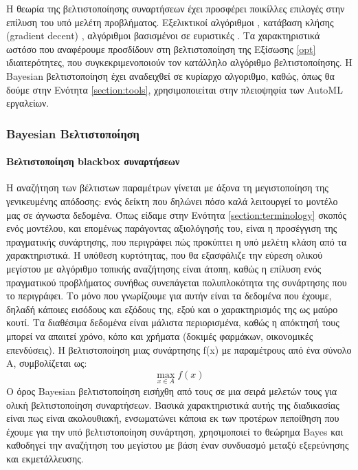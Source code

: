 	Η θεωρία της βελτιστοποίησης συναρτήσεων έχει προσφέρει ποικίλλες επιλογές στην επίλυση του υπό μελέτη προβλήματος. Eξελικτικοί αλγόριθμοι \citep{1554741}, κατάβαση κλήσης (gradient decent) \citep{wassenberg},  αλγόριθμοι βασισμένοι σε ευριστικές \citep{Nelder01011965, Huang2006}. Τα χαρακτηριστικά ωστόσο που αναφέρουμε προσδίδουν στη βελτιστοποίηση της Εξίσωσης \ref{opt} ιδιαιτερότητες, που συγκεκριμενοποιούν τον κατάλληλο αλγόριθμο βελτιστοποίησης. Η Bayesian βελτιστοποίηση έχει αναδειχθεί σε κυρίαρχο αλγοριθμο, καθώς, όπως θα δούμε στην Ενότητα \ref{section:tools}, χρησιμοποιείται στην πλειοψηφία των \gls{AutoML} εργαλείων.
 \subsubsection{Bayesian Βελτιστοποίηση}
 	\paragraph{Βελτιστοποίηση blackbox συναρτήσεων} Η αναζήτηση των βέλτιστων παραμέτρων γίνεται με άξονα τη μεγιστοποίηση της γενικευμένης απόδοσης: ενός δείκτη που δηλώνει πόσο καλά λειτουργεί το μοντέλο μας σε άγνωστα δεδομένα. Όπως είδαμε στην Ενότητα \ref{section:terminology} σκοπός ενός μοντέλου, και επομένως παράγοντας αξιολόγησής του, είναι η προσέγγιση της πραγματικής συνάρτησης, που περιγράφει πώς προκύπτει η υπό μελέτη κλάση από τα χαρακτηριστικά. Η υπόθεση κυρτότητας, που θα εξασφάλιζε την εύρεση ολικού μεγίστου με αλγόριθμο τοπικής αναζήτησης είναι άτοπη, καθώς η επίλυση ενός πραγματικού προβλήματος συνήθως συνεπάγεται πολυπλοκότητα της συνάρτησης που το περιγράφει. Το μόνο που γνωρίζουμε για αυτήν είναι τα δεδομένα που έχουμε, δηλαδή κάποιες εισόδους και εξόδους της, εξού και ο χαρακτηρισμός της ως μαύρο κουτί. Τα διαθέσιμα δεδομένα είναι μάλιστα περιορισμένα, καθώς η απόκτησή τους μπορεί να απαιτεί χρόνο, κόπο και χρήματα (δοκιμές φαρμάκων, οικονομικές επενδύσεις). Η βελτιστοποίηση μιας συνάρτησης f(x) με παραμέτρους από ένα σύνολο A, συμβολίζεται ως:
 \begin{equation}
 \max_{x \in  A } f(x)
 \end{equation}
 	Ο όρος Bayesian βελτιστοποίηση εισήχθη από τους \citet{Mockus1991} σε μια σειρά μελετών τους για ολική βελτιστοποίηση συναρτήσεων. Βασικά χαρακτηριστικά αυτής της διαδικασίας είναι πως είναι ακολουθιακή, ενσωματώνει κάποια εκ των προτέρων πεποίθηση που έχουμε για την υπό βελτιστοποίηση συνάρτηση, χρησιμοποιεί το θεώρημα Bayes και καθοδηγεί την αναζήτηση του μεγίστου με βάση έναν συνδυασμό μεταξύ εξερεύνησης και εκμετάλλευσης.
